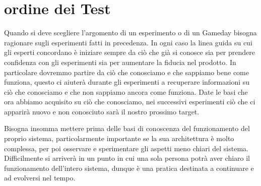 \section{ordine dei Test}
Quando si deve scegliere l'argomento di un esperimento o di un Gameday bisogna ragionare sugli esperimenti fatti in precedenza.
In ogni caso la linea guida su cui gli esperti concordano è iniziare sempre da ciò che già si conosce sia per prendere confidenza con gli esperimenti sia per aumentare la fiducia nel prodotto.
In particolare dovremmo partire da ciò che conosciamo e che sappiamo bene come funziona, questo ci aiuterà durante gli esperimenti a recuperare informazioni su ciò che conosciamo e che non sappiamo ancora come funziona.
Date le basi che ora abbiamo acquisito su ciò che conosciamo, nei successivi esperimenti ciò che ci apparirà nuovo e non conosciuto sarà il nostro prossimo target.

Bisogna insomma mettere prima delle basi di conoscenza del funzionamento del proprio sistema, particolarmente importante se la sua architettura è molto complessa, per poi osservare e sperimentare gli aspetti meno chiari del sistema.
Difficilmente si arriverà in un punto in cui una sola persona potrà aver chiaro il funzionamento dell'intero sistema, dunque è una pratica destinata a continuare e ad evolversi nel tempo.